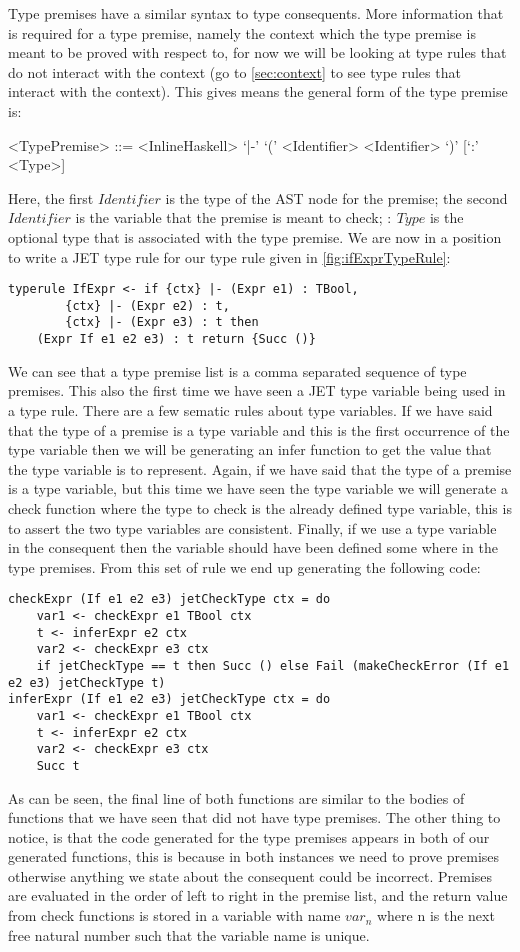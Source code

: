 Type premises have a similar syntax to type consequents.
More information that is required for a type premise, namely the context which the type premise is meant to be proved with respect to, for now we will be looking at type rules that do not interact with the context (go to \autoref{sec:context} to see type rules that interact with the context).
This gives means the general form of the type premise is:
\begin{grammar}
<TypePremise> ::= <InlineHaskell> `|-' `(' <Identifier> <Identifier> `)' [`:' <Type>]
\end{grammar}
Here, the first $Identifier$ is the type of the AST node for the premise; the second $Identifier$ is the variable that the premise is meant to check; $:\ Type$ is the optional type that is associated with the type premise.
We are now in a position to write a JET type rule for our type rule given in \autoref{fig:ifExprTypeRule}:
\begin{lstlisting}
typerule IfExpr <- if {ctx} |- (Expr e1) : TBool, 
        {ctx} |- (Expr e2) : t, 
        {ctx} |- (Expr e3) : t then 
    (Expr If e1 e2 e3) : t return {Succ ()}
\end{lstlisting}
We can see that a type premise list is a comma separated sequence of type premises.
This also the first time we have seen a JET type variable being used in a type rule.
There are a few sematic rules about type variables.
If we have said that the type of a premise is a type variable and this is the first occurrence of the type variable then we will be generating an infer function to get the value that the type variable is to represent.
Again, if we have said that the type of a premise is a type variable, but this time we have seen the type variable we will generate a check function where the type to check is the already defined type variable, this is to assert the two type variables are consistent.
Finally, if we use a type variable in the consequent then the variable should have been defined some where in the type premises.
From this set of rule we end up generating the following code:
\begin{lstlisting}
checkExpr (If e1 e2 e3) jetCheckType ctx = do
    var1 <- checkExpr e1 TBool ctx
    t <- inferExpr e2 ctx
    var2 <- checkExpr e3 ctx
    if jetCheckType == t then Succ () else Fail (makeCheckError (If e1 e2 e3) jetCheckType t)
inferExpr (If e1 e2 e3) jetCheckType ctx = do
    var1 <- checkExpr e1 TBool ctx
    t <- inferExpr e2 ctx
    var2 <- checkExpr e3 ctx
    Succ t
\end{lstlisting}
As can be seen, the final line of both functions are similar to the bodies of functions that we have seen that did not have type premises.
The other thing to notice, is that the code generated for the type premises appears in both of our generated functions, this is because in both instances we need to prove premises otherwise anything we state about the consequent could be incorrect.
Premises are evaluated in the order of left to right in the premise list, and the return value from check functions is stored in a variable with name $var_n$ where n is the next free natural number such that the variable name is unique.

